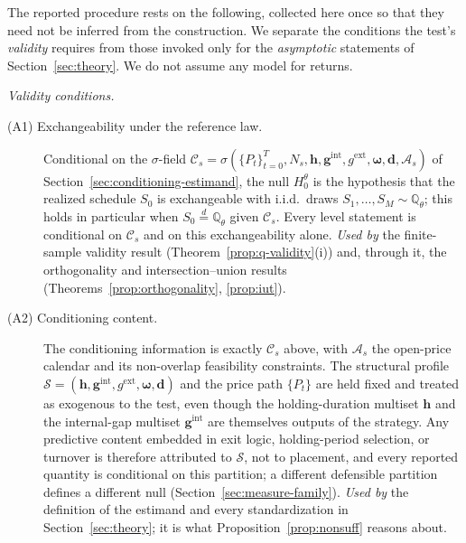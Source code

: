 \documentclass[risks,article,submit,pdftex,oneauthor]{Definitions/mdpi}
\begin{document}
\begin{Assumption}
\label{ass:standing}
The reported procedure rests on the following, collected here once so that
they need not be inferred from the construction. We separate the conditions
the test's \emph{validity} requires from those invoked only for the
\emph{asymptotic} statements of Section~\ref{sec:theory}. We do not assume any
model for returns.

\medskip
\noindent\emph{Validity conditions.}

\begin{description}
\item[(A1) Exchangeability under the reference law.] Conditional on the
$\sigma$-field $\mathcal C_s=\sigma(\{P_t\}_{t=0}^{T},\allowbreak N_s,\allowbreak\mathbf h,
\allowbreak\mathbf g^{\mathrm{int}},\allowbreak g^{\mathrm{ext}},\allowbreak\boldsymbol\omega,\allowbreak\mathbf d,
\allowbreak\mathcal A_s)$ of Section~\ref{sec:conditioning-estimand}, the null
$H_0^\theta$ is the hypothesis that the realized schedule $S_0$ is
exchangeable with i.i.d.\ draws $S_1,\dots,S_M\sim\mathbb{Q}_\theta$; this
holds in particular when $S_0\stackrel{d}{=}\mathbb{Q}_\theta$ given
$\mathcal C_s$. Every level statement is conditional on $\mathcal C_s$ and on
this exchangeability alone. \emph{Used by} the finite-sample validity result
(Theorem~\ref{prop:q-validity}(i)) and, through it, the orthogonality and
intersection--union results (Theorems~\ref{prop:orthogonality},
\ref{prop:iut}).

\item[(A2) Conditioning content.] The conditioning information is exactly
$\mathcal C_s$ above, with $\mathcal A_s$ the open-price calendar and its
non-overlap feasibility constraints. The structural profile
$\mathcal S=(\mathbf h,\mathbf g^{\mathrm{int}},g^{\mathrm{ext}},
\boldsymbol\omega,\mathbf d)$ and the price path $\{P_t\}$ are held fixed and
treated as exogenous to the test, even though the holding-duration multiset
$\mathbf h$ and the internal-gap multiset $\mathbf g^{\mathrm{int}}$ are
themselves outputs of the strategy. Any predictive content embedded in exit
logic, holding-period selection, or turnover is therefore attributed to
$\mathcal S$, not to placement, and every reported quantity is conditional on
this partition; a different defensible partition defines a different null
(Section~\ref{sec:measure-family}). \emph{Used by} the definition of the
estimand and every standardization in Section~\ref{sec:theory}; it is what
Proposition~\ref{prop:nonsuff} reasons about.


\end{description}
\end{Assumption}
\end{document}
